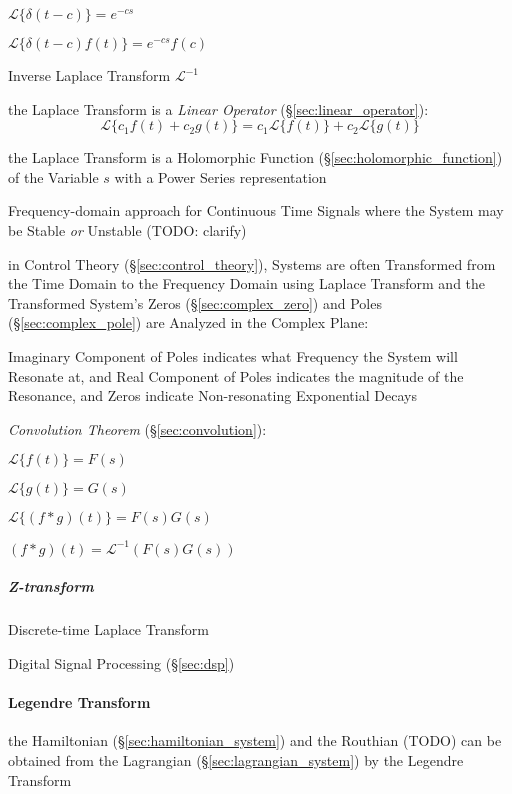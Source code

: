 $\mathcal{L}\{ \delta(t-c) \} = e^{-cs}$

$\mathcal{L}\{ \delta(t-c)f(t) \} = e^{-cs}f(c) $

Inverse Laplace Transform $\mathcal{L}^{-1}$

the Laplace Transform is a \emph{Linear Operator}
(\S\ref{sec:linear_operator}):
\[
  \mathcal{L} \{ c_1 f(t) + c_2 g(t) \}
    = c_1\mathcal{L}\{f(t)\} + c_2\mathcal{L}\{g(t)\}
\]

the Laplace Transform is a Holomorphic Function
(\S\ref{sec:holomorphic_function}) of the Variable $s$ with a Power Series
representation

Frequency-domain approach for Continuous Time Signals where the System may be
Stable \emph{or} Unstable (TODO: clarify)

in Control Theory (\S\ref{sec:control_theory}), Systems are often Transformed
from the Time Domain to the Frequency Domain using Laplace Transform and the
Transformed System's Zeros (\S\ref{sec:complex_zero}) and Poles
(\S\ref{sec:complex_pole}) are Analyzed in the Complex Plane:

Imaginary Component of Poles indicates what Frequency the System will Resonate
at, and Real Component of Poles indicates the magnitude of the Resonance, and
Zeros indicate Non-resonating Exponential Decays


\emph{Convolution Theorem} (\S\ref{sec:convolution}):

$\mathcal{L}\{f(t)\} = F(s)$

$\mathcal{L}\{g(t)\} = G(s)$

$\mathcal{L}\{(f * g)(t)\} = F(s)G(s)$

$(f*g)(t) = \mathcal{L}^{-1}(F(s)G(s))$



\subparagraph{Z-transform}\label{sec:z_transform}

Discrete-time Laplace Transform

Digital Signal Processing (\S\ref{sec:dsp})



\paragraph{Legendre Transform}\label{sec:legendre_transform}\hfill

the Hamiltonian (\S\ref{sec:hamiltonian_system}) and the Routhian (TODO) can be
obtained from the Lagrangian (\S\ref{sec:lagrangian_system}) by the Legendre
Transform



